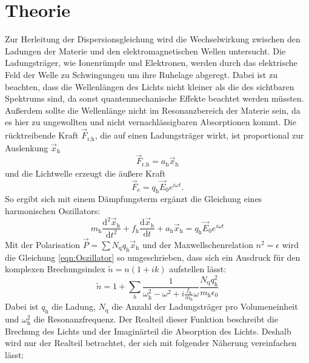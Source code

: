 \section{Theorie}
\label{sec:Theorie}

Zur Herleitung der Dispersionsgleichung wird die Wechselwirkung zwischen den Ladungen der Materie
und den elektromagnetischen Wellen untersucht.
Die Ladungsträger, wie Ionenrümpfe und Elektronen,
werden durch das elektrische Feld der Welle zu Schwingungen um ihre Ruhelage abgeregt.
Dabei ist zu beachten, dass die Wellenlängen des Lichts nicht kleiner als die des sichtbaren Spektrums sind,
da sonst quantenmechanische Effekte beachtet werden müssten.
Außerdem sollte die Wellenlänge nicht im Resonanzbereich der Materie sein,
da es hier zu ungewollten und nicht vernachlässigbaren Absorptionen kommt.
Die rücktreibende Kraft $\vec{F}_\text{r,h}$, die auf einen Ladungsträger wirkt, ist proportional zur Auslenkung $\vec{x}_\text{h}$
\begin{equation}
  \vec{F}_\text{r,h} = a_\text{h} \vec{x}_\text{h}
\end{equation}
und die Lichtwelle erzeugt die äußere Kraft
\begin{equation}
  \vec{F}_\text{e} = q_\text{h} \vec{E}_0 e^{i \omega t}.
\end{equation}
So ergibt sich mit einem Dämpfungsterm ergänzt die Gleichung eines harmonischen Oszillators:
\begin{equation}
  m_\text{h} \frac{\text{d}^2 \vec{x}_\text{h}}{\text{d} t^2} + f_\text{h} \frac{\text{d} \vec{x}_\text{h}}{\text{d} t} + a_\text{h} \vec{x}_\text{h} = q_\text{h} \vec{E}_0 e^{i \omega t}
  \label{eqn:Oszillator}
\end{equation}
Mit der Polarisation $\vec{P} = \sum N_\text{q} q_\text{h} \vec{x}_\text{h} $ und der Maxwellschenrelation $ n^2 = \epsilon $ wird die Gleichung \eqref{eqn:Oszillator} so umgeschrieben,
dass sich ein Ausdruck für den komplexen Brechungsindex $\tilde n = n(1 + ik)$ aufstellen lässt:
\begin{equation}
  \tilde n = 1 + \sum_h \frac{1}{\omega^2_\text{h} - \omega^2 + i \frac{f_\text{h}}{m_\text{h}}\omega} \frac{N_\text{q} q^2_\text{h}}{m_\text{h} \epsilon_0}
\end{equation}
Dabei ist $q_\text{h}$ die Ladung, $N_\text{q}$ die Anzahl der Ladungsträger pro Volumeneinheit und $\omega^2_\text{h}$ die Resonanzfrequenz.
Der Realteil dieser Funktion beschreibt die Brechung des Lichts und der Imaginärteil die Absorption des Lichts.
Deshalb wird nur der Realteil betrachtet, der sich mit folgender Näherung vereinfachen lässt:
